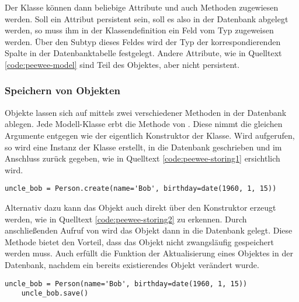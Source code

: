 Der Klasse können dann beliebige Attribute und auch Methoden zugewiesen werden. Soll ein Attribut persistent sein, soll es also in der Datenbank abgelegt werden, so muss ihm in der Klassendefinition ein Feld vom Typ  zugeweisen werden. Über den Subtyp dieses Feldes wird der Typ der korrespondierenden Spalte in der Datenbanktabelle festgelegt. Andere Attribute, wie  in Quelltext \ref{code:peewee-model} sind Teil des Objektes, aber nicht persistent.

\subsubsection*{Speichern von Objekten}

Objekte lassen sich auf mittels zwei verschiedener Methoden in der Datenbank ablegen. Jede Modell-Klasse erbt die Methode  von . Diese nimmt die gleichen Argumente entgegen wie der eigentlich Konstruktor der Klasse. Wird  aufgerufen, so wird eine Instanz der Klasse erstellt, in die Datenbank geschrieben und im Anschluss zurück gegeben, wie in Quelltext \ref{code:peewee-storing1} ersichtlich wird.

\lstset{language=python}
\begin{lstlisting}[caption={Python-Code zum Erzeugen eines Personen-Objektes und zur Speicherung in der Datenbank in einem Schritt.  \cite{noauthor_quickstart_2023}}, label=code:peewee-storing1]
    uncle_bob = Person.create(name='Bob', birthday=date(1960, 1, 15))
\end{lstlisting}

Alternativ dazu kann das Objekt auch direkt über den Konstruktor erzeugt werden, wie in Quelltext \ref{code:peewee-storing2} zu erkennen. Durch anschließenden Aufruf von  wird das Objekt dann in die Datenbank gelegt. Diese Methode bietet den Vorteil, dass das Objekt nicht zwangsläufig gespeichert werden muss. Auch erfüllt  die Funktion der Aktualisierung eines Objektes in der Datenbank, nachdem ein bereits existierendes Objekt verändert wurde.

\lstset{language=python}
\begin{lstlisting}[caption={Python-Code zum Erzeugen eines Personen-Objektes und zur anschließenden Speicherung in der Datenbank.  \cite{noauthor_quickstart_2023}}, label=code:peewee-storing2]
    uncle_bob = Person(name='Bob', birthday=date(1960, 1, 15))
    uncle_bob.save()
\end{lstlisting}

